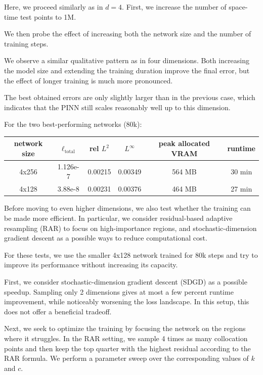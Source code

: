 Here, we proceed similarly as in $d=4$.
First, we increase the number of space-time test points to 1M.

We then probe the effect of increasing both the network size and the number of training steps.

We observe a similar qualitative pattern as in four dimensions.
Both increasing the model size and extending the training duration improve the final error,
but the effect of longer training is much more pronounced.

The best obtained errors are only slightly larger than in the previous case,
which indicates that the PINN still scales reasonably well up to this dimension.

For the two best-performing networks (80k):
\begin{center}
\begin{tabular}{ |c|c|c|c|c|c| } 
\hline
network size & $\ell_{\mathrm{total}}$ & rel $L^2$ & $L^\infty$ & peak allocated VRAM & runtime\\
\hline
4x256 & 1.126e-7 & 0.00215 & 0.00349 & 564 MB & 30 min\\
\hline
4x128 & 3.88e-8 & 0.00231 & 0.00376 & 464 MB & 27 min\\
\hline
\end{tabular}
\end{center}

Before moving to even higher dimensions, we also test whether the training can be made more efficient.
In particular, we consider residual-based adaptive resampling (RAR) to focus on high-importance regions,
and stochastic-dimension gradient descent as a possible ways to reduce computational cost.

For these tests, we use the smaller 4x128 network trained for 80k steps and try to improve its performance without increasing its capacity.

First,
we consider stochastic-dimension gradient descent (SDGD) as a possible speedup.
Sampling only 2 dimensions gives at most a few percent runtime improvement, while noticeably worsening the loss landscape.
In this setup, this does not offer a beneficial tradeoff.

Next, we seek to optimize the training by focusing the network on the regions where it struggles.
In the RAR setting, we sample 4 times as many collocation points and then keep the top quarter with the highest residual according to the RAR formula.
We perform a parameter sweep over the corresponding values of $k$ and $c$.

